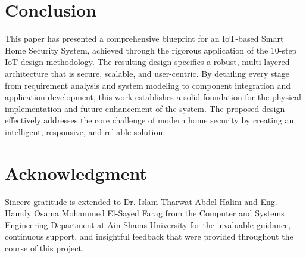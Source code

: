 \documentclass[conference]{IEEEtran}
\begin{document}


\section{Conclusion}
This paper has presented a comprehensive blueprint for an IoT-based Smart Home Security System, achieved through the rigorous application of the 10-step IoT design methodology. The resulting design specifies a robust, multi-layered architecture that is secure, scalable, and user-centric. By detailing every stage from requirement analysis and system modeling to component integration and application development, this work establishes a solid foundation for the physical implementation and future enhancement of the system. The proposed design effectively addresses the core challenge of modern home security by creating an intelligent, responsive, and reliable solution.


\section*{Acknowledgment}
Sincere gratitude is extended to Dr. Islam Tharwat Abdel Halim and Eng. Hamdy Osama Mohammed El-Sayed Farag from the Computer and Systems Engineering Department at Ain Shams University for the invaluable guidance, continuous support, and insightful feedback that were provided throughout the course of this project.


% 
% 
\end{document}
